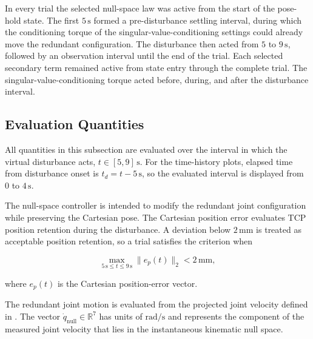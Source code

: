 
In every trial the selected null-space law was active from the start of the
pose-hold state. The first \(5\,\mathrm{s}\) formed a
pre-disturbance settling interval, during which the conditioning torque of the
singular-value-conditioning settings could already move the redundant configuration. The
disturbance then acted from \(5\) to \(9\,\mathrm{s}\), followed by an
observation interval until the end of the trial. Each selected secondary term
remained active from state entry through the complete trial. The
singular-value-conditioning torque acted before, during, and after the
disturbance interval.


\subsection{Evaluation Quantities}

All quantities in this subsection are evaluated over the interval in which
the virtual disturbance acts, \(t\in[5,9]\,\mathrm{s}\). For the time-history
plots, elapsed time from disturbance onset is \(t_d=t-5\,\mathrm{s}\),
so the evaluated interval is displayed from \(0\) to \(4\,\mathrm{s}\).

The null-space
controller is intended to modify the redundant joint configuration while
preserving the Cartesian pose. The Cartesian position error evaluates
TCP position retention during the disturbance. A
deviation below \(2\,\mathrm{mm}\) is treated as acceptable position
retention, so a trial satisfies the criterion when

\begin{equation}
\max_{5\,\mathrm{s}\leq t\leq9\,\mathrm{s}}
\lVert e_p(t)\rVert_2
<2\,\mathrm{mm},
\label{eq:nullspace_cartesian_retention_criterion}
\end{equation}

where \(e_p(t)\) is the Cartesian position-error vector.

The redundant joint motion is evaluated from the projected joint velocity
defined in . The vector
\(\dot q_{\mathrm{null}}\in\mathbb{R}^7\) has units of
\(\mathrm{rad/s}\) and represents the component of the measured joint
velocity that lies in the instantaneous kinematic null space.

